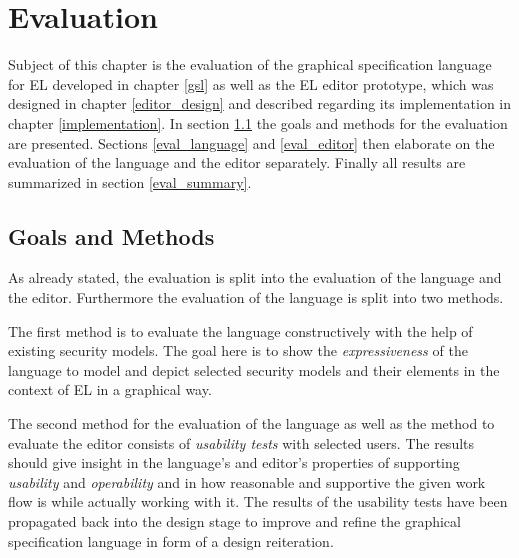 \documentclass[twoside, openright, 12pt]{book}
\begin{document}



\cleardoublepage
\chapter{Evaluation}
\label{evaluation}
Subject of this chapter is the evaluation of the graphical specification language for EL developed in chapter \ref{gsl} as well as the EL editor prototype, which was designed in chapter \ref{editor_design} and described regarding its implementation in chapter \ref{implementation}.
In section \ref{eval_goals} the goals and methods for the evaluation are presented.
Sections \ref{eval_language} and \ref{eval_editor} then elaborate on the evaluation of the language and the editor separately.
Finally all results are summarized in section \ref{eval_summary}.



\section{Goals and Methods}
\label{eval_goals}
As already stated, the evaluation is split into the evaluation of the language and the editor.
Furthermore the evaluation of the language is split into two methods.

The first method is to evaluate the language constructively with the help of existing security models.
The goal here is to show the \textit{expressiveness} of the language to model and depict selected security models and their elements in the context of EL in a graphical way.

The second method for the evaluation of the language as well as the method to evaluate the editor consists of \textit{usability tests} with selected users.
The results should give insight in the language's and editor's properties of supporting \textit{usability} and \textit{operability} and in how reasonable and supportive the given work flow is while actually working with it.
The results of the usability tests have been propagated back into the design stage to improve and refine the graphical specification language in form of a design reiteration.
\end{document}
